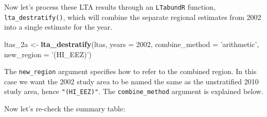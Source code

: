 \documentclass[
]{book}
\newenvironment{Shaded}{\begin{snugshade}}{\end{snugshade}}
\newcommand{\DataTypeTok}[1]{\textcolor[rgb]{0.13,0.29,0.53}{#1}}
\newcommand{\DecValTok}[1]{\textcolor[rgb]{0.00,0.00,0.81}{#1}}
\newcommand{\FloatTok}[1]{\textcolor[rgb]{0.00,0.00,0.81}{#1}}
\newcommand{\KeywordTok}[1]{\textcolor[rgb]{0.13,0.29,0.53}{\textbf{#1}}}
\newcommand{\NormalTok}[1]{#1}
\newcommand{\OperatorTok}[1]{\textcolor[rgb]{0.81,0.36,0.00}{\textbf{#1}}}
\newcommand{\OtherTok}[1]{\textcolor[rgb]{0.56,0.35,0.01}{#1}}
\newcommand{\StringTok}[1]{\textcolor[rgb]{0.31,0.60,0.02}{#1}}
\begin{document}
\begin{Shaded}
\end{Shaded}

Now let's process these LTA results through an \texttt{LTabundR} function, \texttt{lta\_destratify()}, which will combine the separate regional estimates from 2002 into a single estimate for the year.

\begin{Shaded}
\begin{Highlighting}[]
\NormalTok{ltas_2a <-}
\StringTok{  }\KeywordTok{lta_destratify}\NormalTok{(ltas,}
               \DataTypeTok{years =} \DecValTok{2002}\NormalTok{,}
               \DataTypeTok{combine_method =} \StringTok{'arithmetic'}\NormalTok{,}
               \DataTypeTok{new_region =} \StringTok{'(HI_EEZ)'}\NormalTok{)}
\end{Highlighting}
\end{Shaded}

The \texttt{new\_region} argument specifies how to refer to the combined region. In this case we want the 2002 study area to be named the same as the unstratified 2010 study area, hence \texttt{"(HI\_EEZ)"}. The \texttt{combine\_method} argument is explained below.

Now let's re-check the summary table:
\end{document}
